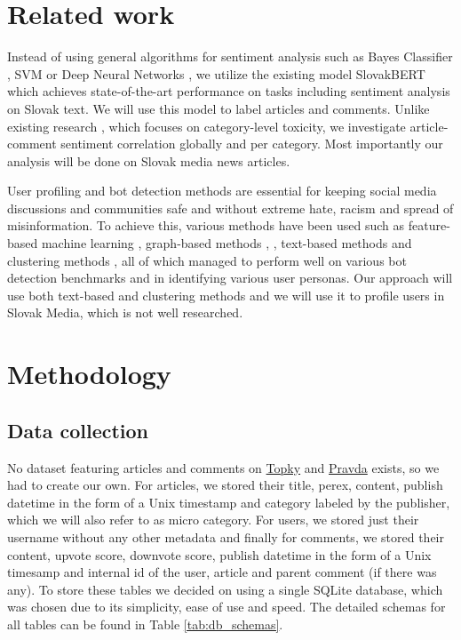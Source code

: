 \documentclass[11pt,a4paper]{article}
\def\topky{\href{https://topky.sk}{Topky}}
\def\pravda{\href{https://pravda.sk}{Pravda}}
\begin{document}
\section{Related work}
Instead of using general algorithms for sentiment analysis such as Bayes Classifier \cite{Pak2010}, SVM \cite{Li2013} or Deep Neural Networks \cite{Basiri2021}, we utilize the existing model SlovakBERT \cite{Pikuliak2022} which achieves state-of-the-art performance on tasks including sentiment analysis on Slovak text. We will use this model to label articles and comments. Unlike existing research \cite{Salminen2020}, which focuses on category-level toxicity, we investigate article-comment sentiment correlation globally and per category. Most importantly our analysis will be done on Slovak media news articles.

User profiling and bot detection methods are essential for keeping social media discussions and communities safe and without extreme hate, racism and spread of misinformation. To achieve this, various methods have been used such as feature-based machine learning \cite{Tadesse2018}, graph-based methods \cite{Feng2023}, \cite{Tan2023}, text-based methods \cite{Heidari2020} and clustering methods \cite{Kanwal2024}, all of which managed to perform well on various bot detection benchmarks and in identifying various user personas. Our approach will use both text-based and clustering methods and we will use it to profile users in Slovak Media, which is not well researched.

\section{Methodology}

\subsection{Data collection}
No dataset featuring articles and comments on \topky{} and \pravda{} exists, so we had to create our own. For articles, we stored their title, perex, content, publish datetime in the form of a Unix timestamp and category labeled by the publisher, which we will also refer to as micro category. For users, we stored just their username without any other metadata and finally for comments, we stored their content, upvote score, downvote score, publish datetime in the form of a Unix timesamp and internal id of the user, article and parent comment (if there was any). To store these tables we decided on using a single SQLite database, which was chosen due to its simplicity, ease of use and speed. The detailed schemas for all tables can be found in Table \ref{tab:db_schemas}.
\end{document}
